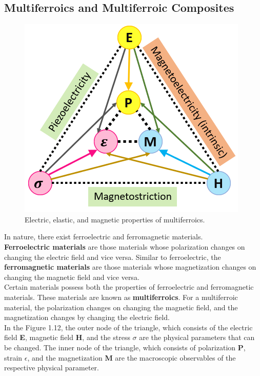 \documentclass[12pt,a4paper,bold]{thesis}
\theoremstyle{thm}
\theoremstyle{definition}
\begin{document}
\subsection{Multiferroics and Multiferroic Composites}
\begin{figure}[H]
	\centering
   \includegraphics[scale=0.56]{Images/18.png} 
   \caption{Electric, elastic, and magnetic properties of multiferroics.}
\end{figure}
\indent \indent \indent In nature, there exist ferroelectric and ferromagnetic materials. \\
\textbf{Ferroelectric materials} are those materials whose polarization changes on changing the electric field and vice versa.
Similar to ferroelectric, the \textbf{ferromagnetic materials} are those materials whose magnetization changes on changing the magnetic field and vice versa. \\
\indent \indent Certain materials possess both the properties of ferroelectric and ferromagnetic materials. These materials are known as \textbf{multiferroics}. For a multiferroic material, the polarization changes on changing the magnetic field, and the magnetization changes by changing the electric field.\\   
In the Figure 1.12, the outer node of the triangle, which consists of the electric field \textbf{E}, magnetic field \textbf{H}, and the stress \textbf{$\sigma$} are the physical parameters that can be changed. The inner node of the triangle, which consists of polarization \textbf{P}, strain \textbf{$\epsilon$}, and the magnetization \textbf{M} are the macroscopic observables of the respective physical parameter.\\\\
\end{document}
